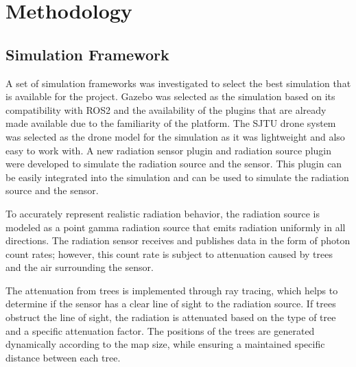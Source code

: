 \documentclass[../report.tex]{subfiles}
\begin{document}
    \section{Methodology}
    \label{sec:methodology}


    \subsection{Simulation Framework}
    A set of simulation frameworks was investigated to select the best simulation that is available for the project. Gazebo was selected as the simulation based on its compatibility with ROS2 
    and the availability of the plugins that are already made available due to the familiarity of the platform. The SJTU drone system was selected as the drone model for the simulation as it was 
    lightweight and also easy to work with. A new radiation sensor plugin and radiation source plugin were developed to simulate the radiation source and the sensor. This plugin can be easily 
    integrated into the simulation and can be used to simulate the radiation source and the sensor. 
        
    To accurately represent realistic radiation behavior, the radiation source is modeled as a point gamma radiation source that emits radiation uniformly in all directions. The radiation sensor 
    receives and publishes data in the form of photon count rates; however, this count rate is subject to attenuation caused by trees and the air surrounding the sensor. 

    The attenuation from trees is implemented through ray tracing, which helps to determine if the sensor has a clear line of sight to the radiation source. If trees obstruct the line of sight, 
    the radiation is attenuated based on the type of tree and a specific attenuation factor. The positions of the trees are generated dynamically according to the map size, while ensuring a 
    maintained specific distance between each tree.
        

\end{document}
